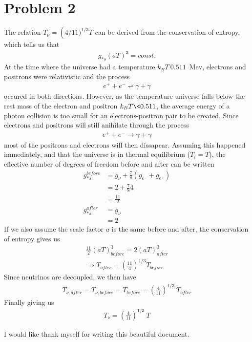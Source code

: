 \documentclass[reprint,english,notitlepage]{revtex4-1}  %
\numberwithin{equation}{section}
\begin{document}
\section{Problem 2}
The relation $T_\nu = \left(4/11)^{1/3} T$ can be derived from the conservation
of entropy, which tells us that
\begin{align}
	g_{*s}(aT)^3 = const.
\end{align}
At the time where the universe had a temperature $k_B T \> 0.511$ Mev, electrons
and positrons were relativistic and the process
\begin{align}
	e^+ + e^- \rightleftharpoon \gamma + \gamma
\end{align}
occured in both directions. However, as the temperature universe falls below the
rest mass of the electron and positron $k_B T \< 0.511$, the average energy of a
photon collision is too small for an electrons-positron pair to be created.
Since electrons and positrons will still anihilate through the process
\begin{align}
	e^+ + e^- \rightarrow \gamma + \gamma
\end{align}
most of the positrons and electrons will then dissapear. Assuming this happened
immediately, and that the universe is in thermal equilibrium ($T_i=T$), the
effective number of degrees of freedom before and after can be written
\begin{align}
	g_{*s}^{before} &= g_\nu + \frac{7}{8}(g_{e^-} + g_{e^+}) \\
									&= 2 + \frac{7}{8}4 \\
									&= \frac{11}{2} \\
	g_{*s}^{after} &= g_\nu \\
								 &= 2
\end{align}
If we also assume the scale factor $a$ is the same before and after, the
conservation of entropy gives us
\begin{align}
	\frac{11}{2}(aT)_{before}^3 = 2(aT)_{after}^3 \\
	\Rightarrow T_{after} = (\frac{11}{4})^{1/3} T_{before}
\end{align}
Since neutrinos are decoupled, we then have
\begin{align}
	T_{\nu,after} = T_{\nu,before} = T_{before} = (\frac{4}{11})^{1/3} \ T_{after}
\end{align}
Finally giving us
\begin{align}
	T_\nu = (\frac{4}{11})^{1/3} \ T
\end{align}
\begin{acknowledgments}  %
I would like thank myself for writing this beautiful document.
\end{acknowledgments}
\end{document}
